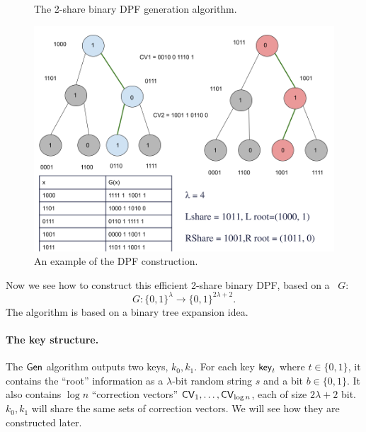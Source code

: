\begin{figure}
\begin{minipage}{\textwidth}
\begin{mdframed}
        \end{mdframed}
    \end{minipage}
    \caption{The 2-share binary DPF generation algorithm.\label{fig:DPF}}
\end{figure}

\begin{figure}
    \centering
    \includegraphics[scale=0.4]{scribimg_dpftree.png}
    \caption{An example of the DPF construction.\label{fig:example-DPF}}
\end{figure}


Now we see how to construct this efficient 2-share binary DPF, based on a \Prg~$G$:
 $$G: \{0,1\}^{\lambda} \rightarrow  \{0,1\}^{2\lambda + 2}. $$
The algorithm is based on a binary tree expansion idea.
 
\paragraph{The key structure.} The ${\sf Gen}$ algorithm outputs two keys, $k_0, k_1$. For each key ${\sf key}_t$ where $t\in\{0,1\}$, it contains the ``root'' information as a $\lambda$-bit random string $s$ and a bit $b\in\{0,1\}$. It also contains $\log n$ ``correction vectors'' ${\sf CV}_1, \dots, {\sf CV}_{\log n}$, each of size $2\lambda+2$ bit. $k_0, k_1$ will share the same sets of correction vectors. 
We will see how they are constructed later. 



